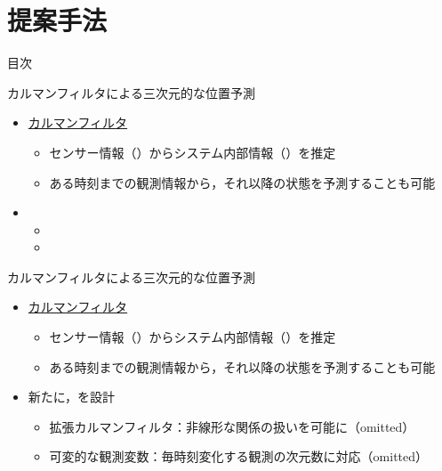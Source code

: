\section{提案手法}

\begin{frame}[noframenumbering]{目次}
    \tableofcontents[currentsection]
\end{frame}

\begin{frame}{カルマンフィルタによる三次元的な位置予測}
    \begin{itemize}
        \item \uline{カルマンフィルタ}
        \begin{itemize}
            \item センサー情報（）からシステム内部情報（）を推定
            \item ある時刻までの観測情報から，それ以降の状態を予測することも可能
        \end{itemize}
        \item[\phantom{}] 
        \begin{itemize}
            \item[\phantom{}] \phantom{拡張カルマンフィルタ：非線形な関係の扱いを可能に（omitted）}
            \item[\phantom{}] \phantom{可変的な観測変数：毎時刻変化する観測の次元数に対応（omitted）}
        \end{itemize}
    \end{itemize}
\end{frame}
\begin{frame}[noframenumbering]{カルマンフィルタによる三次元的な位置予測}
    \begin{itemize}
        \item \uline{カルマンフィルタ}
        \begin{itemize}
            \item センサー情報（）からシステム内部情報（）を推定
            \item ある時刻までの観測情報から，それ以降の状態を予測することも可能
        \end{itemize}
        \item 新たに，を設計
        \begin{itemize}
            \item 拡張カルマンフィルタ：非線形な関係の扱いを可能に（omitted）
            \item 可変的な観測変数：毎時刻変化する観測の次元数に対応（omitted）
        \end{itemize}
    \end{itemize}
\end{frame}
